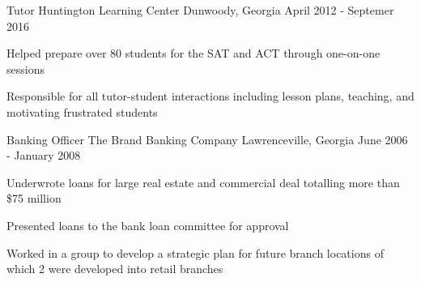 \begin{cventries}
\cventry
    {Tutor} %
    {Huntington Learning Center} %
    {Dunwoody, Georgia} %
    {April 2012 - Septemer 2016} %
    {
      \begin{cvitems} %
        \item {Helped prepare over 80 students for the SAT and ACT through one-on-one sessions}
        \item {Responsible for all tutor-student interactions including lesson plans, teaching, and motivating frustrated students}
      \end{cvitems}
    }
  \cventry
    {Banking Officer} %
    {The Brand Banking Company} %
    {Lawrenceville, Georgia} %
    {June 2006 - January 2008} %
    {
      \begin{cvitems} %
        \item {Underwrote loans for large real estate and commercial deal totalling more than \$75 million }
        \item {Presented loans to the bank loan committee for approval}
        \item {Worked in a group to develop a strategic plan for future branch locations of which 2 were developed into retail branches}
      \end{cvitems} 
    }

\end{cventries}
